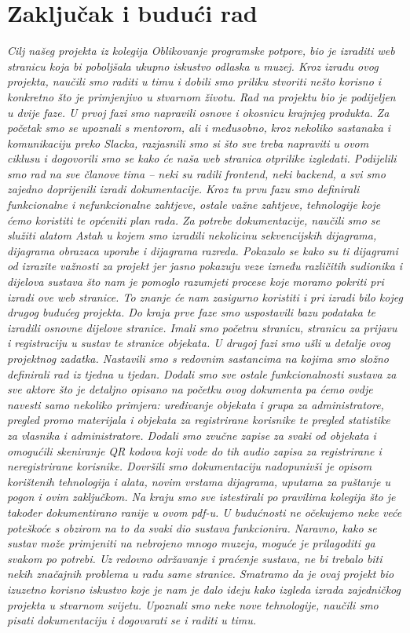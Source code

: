\chapter{Zaključak i budući rad}
		
		 \textit{Cilj našeg projekta iz kolegija Oblikovanje programske potpore, bio je izraditi web stranicu koja bi poboljšala ukupno iskustvo odlaska u muzej. Kroz izradu ovog projekta, naučili smo raditi u timu i dobili smo priliku stvoriti nešto korisno i konkretno što je primjenjivo u stvarnom životu. Rad na projektu bio je podijeljen u dvije faze. 
                U prvoj fazi smo napravili osnove i okosnicu krajnjeg produkta. Za početak smo se upoznali s mentorom, ali i međusobno, kroz nekoliko sastanaka i komunikaciju preko Slacka, razjasnili smo si što sve treba napraviti u ovom ciklusu i dogovorili smo se kako će naša web stranica otprilike izgledati. Podijelili smo rad na sve članove tima – neki su radili frontend, neki backend, a svi smo zajedno doprijenili izradi dokumentacije. Kroz tu prvu fazu smo definirali funkcionalne i nefunkcionalne zahtjeve, ostale važne zahtjeve, tehnologije koje ćemo koristiti te općeniti plan rada. Za potrebe dokumentacije, naučili smo se služiti alatom Astah u kojem smo izradili nekolicinu sekvencijskih dijagrama, dijagrama obrazaca uporabe i dijagrama razreda. Pokazalo se kako su ti dijagrami od izrazite važnosti za projekt jer jasno pokazuju veze između različitih sudionika i dijelova sustava što nam je pomoglo razumjeti procese koje moramo pokriti pri izradi ove web stranice. To znanje će nam zasigurno koristiti i pri izradi bilo kojeg drugog budućeg projekta. Do kraja prve faze smo uspostavili bazu podataka te izradili osnovne dijelove stranice. Imali smo početnu stranicu, stranicu za prijavu i registraciju u sustav te stranice objekata. 
                U drugoj fazi smo ušli u detalje ovog projektnog zadatka. Nastavili smo s redovnim sastancima na kojima smo složno definirali rad iz tjedna u tjedan. Dodali smo sve ostale funkcionalnosti sustava za sve aktore što je detaljno opisano na početku ovog dokumenta pa ćemo ovdje navesti samo nekoliko primjera:  uređivanje objekata i grupa za administratore, pregled promo materijala i objekata za registrirane korisnike te pregled statistike za vlasnika i administratore. Dodali smo zvučne zapise za svaki od objekata i omogućili skeniranje QR kodova koji vode do tih audio zapisa za registrirane i neregistrirane korisnike. Dovršili smo dokumentaciju nadopunivši je opisom korištenih tehnologija i alata, novim vrstama dijagrama, uputama za puštanje u pogon i ovim zaključkom. Na kraju smo sve istestirali po pravilima kolegija što je također dokumentirano ranije u ovom pdf-u. 
                U budućnosti ne očekujemo neke veće poteškoće s obzirom na to da svaki dio sustava funkcionira. Naravno, kako se sustav može primjeniti na nebrojeno mnogo muzeja, moguće je prilagoditi ga svakom po potrebi. Uz redovno održavanje i praćenje sustava, ne bi trebalo biti nekih značajnih problema u radu same stranice. 
                Smatramo da je ovaj projekt bio izuzetno korisno iskustvo koje je nam je dalo ideju kako izgleda izrada zajedničkog projekta u stvarnom svijetu. Upoznali smo neke nove tehnologije, naučili smo pisati dokumentaciju i dogovarati se i raditi u timu. 
}
		
		 
		
		\eject 